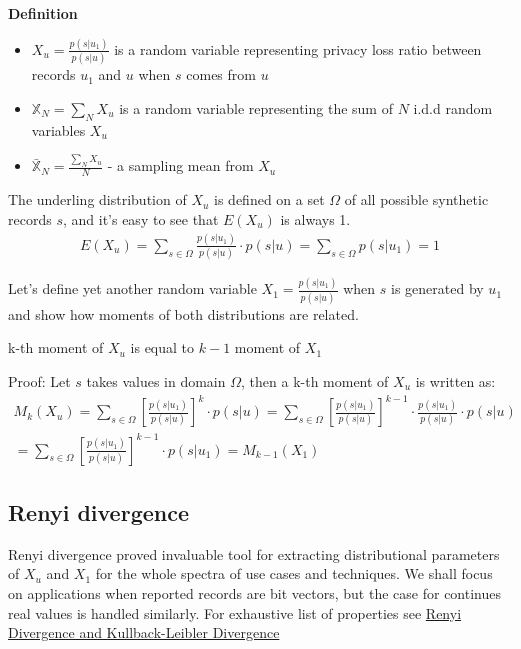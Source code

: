 \documentclass[11pt]{article}
\begin{document}
\textbf{Definition}
\begin{itemize}
\item $X_u = \frac{p(s | u_1) } { p(s| u)}$ is a random variable representing privacy loss ratio between records $u_1$ and $u$ when $s$ comes from $u$
\item $\mathbb{X}_N = \sum_N X_u$ is a random variable representing the sum of $N$ i.d.d random variables $X_u$
\item $\bar{\mathbb{X}}_N = \frac{\sum_N X_u}{N}$ - a sampling mean from $X_u$
\end{itemize}

 The underling distribution of $X_u$ is defined on a set $\Omega$ of all possible synthetic records $s$, and it's easy to see that $E(X_u)$ is always 1.
\begin{align}
E(X_u) = \sum_{s \in \Omega}   \frac{p(s | u_1) } { p(s| u)} \cdot p(s|u) = \sum_{s \in \Omega} p(s|u_1) = 1
\end{align}

Let's define yet another random variable $X_1 = \frac{p(s|u_1)}{p(s|u)}$ when $s$ is generated by $u_1$ and show how moments of both distributions are related. 

\begin{lem}
k-th moment of $X_u$ is equal to $k-1$ moment of $X_1$
\end{lem}
 
 Proof:
 Let $s$ takes values in domain $\Omega$, then a k-th moment of $X_u$ is written as:
 \begin{align}
M_k(X_u) =  \sum_{s \in \Omega} \left [ \frac{p(s|u_1)}{p(s|u)} \right ]^k \cdot p(s|u) =  \sum_{s \in \Omega} \left [ \frac{p(s|u_1)}{p(s|u)} \right ]^{k-1} \cdot  \frac{p(s|u_1)}{p(s|u)} \cdot p(s|u) \\
=  \sum_{s \in \Omega} \left [ \frac{p(s|u_1)}{p(s|u)} \right ]^{k-1} \cdot  p(s|u_1) = M_{k-1}(X_1) 
 \end{align}
 
 \subsection{Renyi divergence}
 
Renyi divergence proved invaluable tool for extracting distributional parameters of $X_u$ and $X_1$ for the whole spectra of use cases and techniques.  We shall focus on applications when reported records are bit vectors, but the case for continues real values is handled similarly.   For exhaustive list of properties see \href{https://arxiv.org/pdf/1206.2459.pdf}{Renyi Divergence and Kullback-Leibler Divergence}
 
\end{document}
